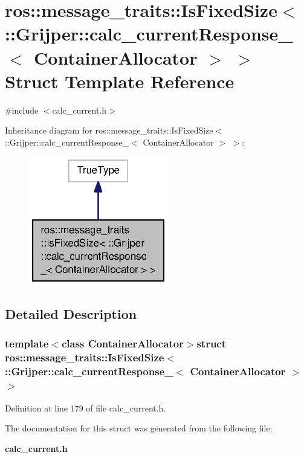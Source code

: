 \section{ros\-:\-:message\-\_\-traits\-:\-:Is\-Fixed\-Size$<$ \-:\-:Grijper\-:\-:calc\-\_\-current\-Response\-\_\-$<$ Container\-Allocator $>$ $>$ Struct Template Reference}
\label{structros_1_1message__traits_1_1IsFixedSize_3_01_1_1Grijper_1_1calc__currentResponse___3_01ContainerAllocator_01_4_01_4}


{\ttfamily \#include $<$calc\-\_\-current.\-h$>$}



Inheritance diagram for ros\-:\-:message\-\_\-traits\-:\-:Is\-Fixed\-Size$<$ \-:\-:Grijper\-:\-:calc\-\_\-current\-Response\-\_\-$<$ Container\-Allocator $>$ $>$\-:\nopagebreak
\begin{figure}[H]
\begin{center}
\leavevmode
\includegraphics[width=172pt]{structros_1_1message__traits_1_1IsFixedSize_3_01_1_1Grijper_1_1calc__currentResponse___3_01Conta1ba052027c5adc6271c22e181d230003}
\end{center}
\end{figure}


\subsection{Detailed Description}
\subsubsection*{template$<$class Container\-Allocator$>$struct ros\-::message\-\_\-traits\-::\-Is\-Fixed\-Size$<$ \-::\-Grijper\-::calc\-\_\-current\-Response\-\_\-$<$ Container\-Allocator $>$ $>$}



Definition at line 179 of file calc\-\_\-current.\-h.



The documentation for this struct was generated from the following file\-:\begin{DoxyCompactItemize}
\item 
{\bf calc\-\_\-current.\-h}\end{DoxyCompactItemize}
